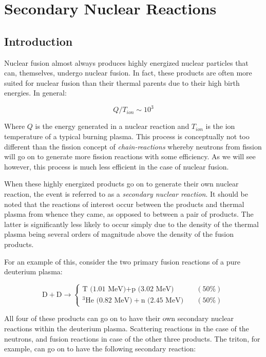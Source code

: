 \section{Secondary Nuclear Reactions}

\subsection{Introduction}
	
	Nuclear fusion almost always produces highly energized nuclear particles that can, themselves, undergo nuclear fusion. In fact, these products are often more suited for nuclear fusion than their thermal parents due to their high birth energies. In general:
	
	\begin{equation}
		Q / T_{ion} \sim 10^3
	\end{equation}

	Where $Q$ is the energy generated in a nuclear reaction and $T_{ion}$ is the ion temperature of a typical burning plasma. This process is conceptually not too different than the fission concept of \emph{chain-reactions} whereby neutrons from fission will go on to generate more fission reactions with some efficiency. As we will see however, this process is much less efficient in the case of nuclear fusion.
	
	When these highly energized products go on to generate their own nuclear reaction, the event is referred to as a \emph{secondary nuclear reaction}. It should be noted that the reactions of interest occur between the products and thermal plasma from whence they came, as opposed to between a pair of products. The latter is significantly less likely to occur simply due to the density of the thermal plasma being several orders of magnitude above the density of the fusion products. 
	
	For an example of this, consider the two primary fusion reactions of a pure deuterium plasma:
	
	\begin{equation}
		\text{D} + \text{D} \rightarrow \begin{cases}
			\text{T (1.01 MeV)} + \text{p (3.02 MeV)} \quad & (50\%)\\
			^3\text{He (0.82 MeV)} + \text{n (2.45 MeV)} \quad & (50\%)
		\end{cases}
	\end{equation}
	
	All four of these products can go on to have their own secondary nuclear reactions within the deuterium plasma. Scattering reactions in the case of the neutrons, and fusion reactions in case of the other three products. The triton, for example, can go on to have the following secondary reaction:
	
